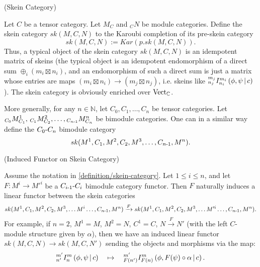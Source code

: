 \begin{definition}\label{definition/skein-category} (Skein Category)

  \noindent Let $C$ be a tensor category. Let $M_{C}$ and $_{C}N$ be module
  categories. \quad Define the skein category $sk(M,C,N)$ to the Karoubi
  completion of its pre-skein category
  \[
    sk(M,C,N) := Kar(p.sk(M,C,N)).
  \]
  \noindent Thus, a typical object of the skein category $sk(M,C,N)$ is an
  idempotent matrix of skeins (the typical object is an idempotent
  endomorphism of a direct sum $\oplus_{i} (m_{i} \boxtimes n_{i})$, and an
  endomorphism of such a direct sum is just a matrix whose entries are maps
  $(m_{i} \boxtimes n_{i}) \to (m_{j} \boxtimes n_{j})$, i.e. skeins like
  ${}^{m_{j}}_{n_{j}} I^{m_{i}}_{n_{i}} \left( \phi, \psi \,\middle|\, c \right)$). The skein category is
  obviously enriched over $\operatorname{Vect}_{\mathbb{C}}$.

  More generally, for any $n \in \mathbb{N}$, let
  $C_{0}, C_{1}, \ldots, C_{n}$ be tensor categories. Let
  ${}_{C_{0}}M^{1}_{C_{1}}, \, {}_{C_{1}}M^{2}_{C_{2}}, \ldots, {}_{C_{n{\text -}1}}M^{n}_{C_{n}}$
  be bimodule categories. One can in a similar way define the
  $C_{0}{\text -}C_{n}$ bimodule category
  \[
    sk(M^{1}, C_{1}, M^{2}, C_{2}, M^{3}, \ldots, C_{n{\text -}1}, M^{n}).
  \]
  \begin{center}
    
  \end{center}

\end{definition}

\begin{definition} \label{definition/induced-functor-on-skein-category} (Induced Functor on Skein Category)

  \noindent Assume the notation in \ref{definition/skein-category}. Let
  $1 \leq i \leq n$, and let $F: M^{i} \to M'^{i}$ be a
  $C_{i{\text -}1}{\text -}C_{i}$ bimodule category functor. \quad Then $F$
  naturally induces a linear functor between the skein categories
  \[
    sk(M^{1}, C_{1}, M^{2}, C_{2}, M^{3}, \ldots M^{i} \ldots, C_{n{\text -}1}, M^{n})
    \xrightarrow{F}
    sk(M^{1}, C_{1}, M^{2}, C_{2}, M^{3}, \ldots M'^{i} \ldots, C_{n{\text -}1}, M^{n}).
  \]
  For example, if $n=2$, $M^{1} = M$, $M^{2} = N$, $C^{1} = C$, $N \xrightarrow{F} N'$
  (with the left $C$-module structure given by $\alpha$), then we have an
  induced linear functor $sk(M,C,N) \to sk(M,C,N')$ sending the objects and morphisms via the map:
  \[
    {}^{m'}_{n'} I^{m}_{n} \left( \phi, \psi \,\middle|\, c \right)
    \quad \mapsto \quad
    {}^{m'}_{F(n')} I^{m}_{F(n)} \left( \phi, F(\psi) \circ \alpha \,\middle|\, c \right).
  \]
\end{definition}

